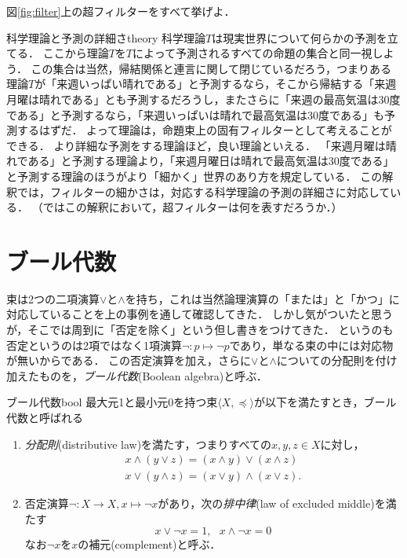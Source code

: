 \documentclass[11pt,a4paper, dvipdfmx]{jsarticle}
\begin{document}
\begin{renshu}{}{}
    図\ref{fig:filter}上の超フィルターをすべて挙げよ．
\end{renshu}

\begin{rei}{科学理論と予測の詳細さ}{theory}
科学理論$T$は現実世界について何らかの予測を立てる．
ここから理論$T$を$T$によって予測されるすべての命題の集合と同一視しよう．
この集合は当然，帰結関係と連言に関して閉じているだろう，つまりある理論$T$が「来週いっぱい晴れである」と予測するなら，そこから帰結する「来週月曜は晴れである」とも予測するだろうし，またさらに「来週の最高気温は30度である」と予測するなら，「来週いっぱいは晴れで最高気温は30度である」も予測するはずだ．
よって理論は，命題束上の固有フィルターとして考えることができる．
より詳細な予測をする理論ほど，良い理論といえる．
「来週月曜は晴れである」と予測する理論より，「来週月曜日は晴れで最高気温は30度である」と予測する理論のほうがより「細かく」世界のあり方を規定している．
この解釈では，フィルターの細かさは，対応する科学理論の予測の詳細さに対応している．
（ではこの解釈において，超フィルターは何を表すだろうか．）
\end{rei}





\section{ブール代数}

束は2つの二項演算$\vee$と$\wedge$を持ち，これは当然論理演算の「または」と「かつ」に対応していることを上の事例を通して確認してきた．
しかし気がついたと思うが，そこでは周到に「否定を除く」という但し書きをつけてきた．
というのも否定というのは2項ではなく1項演算$\neg:p \mapsto \neg p$であり，単なる束の中には対応物が無いからである．
この否定演算を加え，さらに$\vee$と$\wedge$についての分配則を付け加えたものを，\emph{ブール代数}(Boolean algebra)と呼ぶ．

\begin{dfn}{ブール代数}{bool}
    最大元1と最小元0を持つ束$\langle X, \preceq \rangle$が以下を満たすとき，ブール代数と呼ばれる
    \begin{enumerate}
        \item \emph{分配則}(distributive law)を満たす，つまりすべての$x, y, z \in X$に対し，
        \begin{align}
         x \wedge (y \vee z) = (x \wedge y) \vee (x \wedge z) \label{eqn:dist1}\\
         x \vee (y \wedge z) = (x \vee y) \wedge (x \vee z) . \label{eqn:dist2}
        \end{align}
        \item 否定演算$\neg: X \to X, x \mapsto \neg x$があり，次の\emph{排中律}(law of excluded middle)を満たす
        \begin{equation}
            x \vee \neg x = 1, \ \ \ x \wedge \neg x = 0
           \label{eqn:excluded_middle}
        \end{equation}
        なお$\neg x$を$x$の補元(complement)と呼ぶ．
    \end{enumerate}   
\end{dfn}
\end{document}

